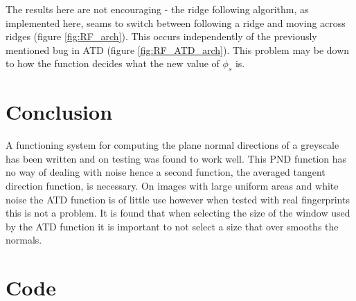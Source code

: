 \documentclass[11pt,a4paper]{article}
\begin{document}
\begin{multicols}{2}
		The results here are not encouraging - the ridge following algorithm, as implemented here, seams to switch between following a ridge and moving across ridges (figure \ref{fig:RF_arch}). This occurs independently of the previously mentioned bug in ATD (figure \ref{fig:RF_ATD_arch}). This problem may be down to how the function decides what the new value of $\phi_s$ is.

\section{Conclusion}
	A functioning system for computing the plane normal directions of a greyscale has been written and on testing was found to work well. This PND function has no way of dealing with noise hence a second function, the averaged tangent direction function, is necessary. On images with large uniform areas and white noise the ATD function is of little use however when tested with real fingerprints this is not a problem. It is found that when selecting the size of the window used by the ATD function it is important to not select a size that over smooths the normals.

\printbibliography
\end{multicols}

\appendix
\section{Code}
	
\end{document}
